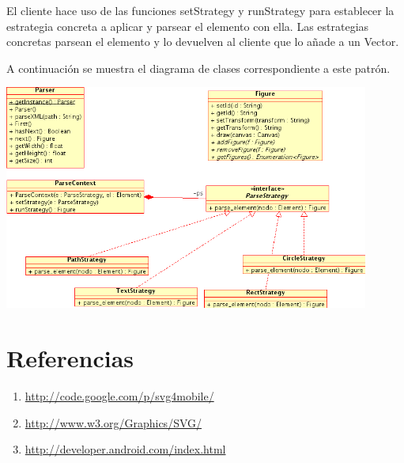 \documentclass[a4paper,10pt]{article}
\begin{document}
El cliente hace uso de las funciones setStrategy y runStrategy para establecer la estrategia concreta a aplicar y parsear el elemento con ella. Las estrategias concretas parsean el elemento y lo devuelven al cliente que lo añade a un Vector.

A continuación se muestra el diagrama de clases correspondiente a este patrón.

\begin{center}
 \includegraphics[width=12cm]{texres/strategy.png}
\end{center}

\clearpage
\section{Referencias}

\begin{enumerate}
\item \url{http://code.google.com/p/svg4mobile/}
\item \url{http://www.w3.org/Graphics/SVG/}
\item \url{http://developer.android.com/index.html}
\end{enumerate}
\end{document}
